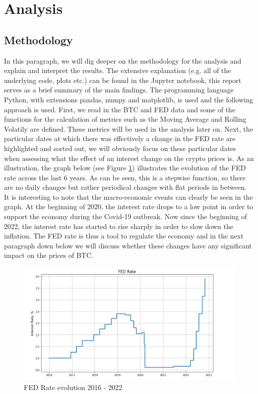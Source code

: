 \documentclass[12pt]{article}
\begin{document}
\section{Analysis}
\subsection{Methodology}
In this paragraph, we will dig deeper on the methodology for the analysis and explain and interpret the results. The extensive explanation (e.g. all of the underlying code, plots etc.) can be found in the Jupyter notebook, this report serves as a brief summary of the main findings. \newline \newline
The programming language Python, with extensions pandas, numpy and matplotlib, is used and the following approach is used. First, we read in the BTC and FED data and some of the functions for the calculation of metrics such as the Moving Average and Rolling Volatily are defined. These metrics will be used in the analysis later on. Next, the particular dates at which there was effectively a change in the FED rate are highlighted and sorted out, we will obviously focus on these particular dates when assessing what the effect of an interest change on the crypto prices is. \newline
\newline As an illustration, the graph below (see Figure \ref{fig:FED Rate evolution 2016 - 2022}) illustrates the evolution of the FED rate across the last 6 years. As can be seen, this is a stepwise function, so there are no daily changes but rather periodical changes with flat periods in between. \newline It is interesting to note that the macro-economic events can clearly be seen in the graph. At the beginning of 2020, the interest rate drops to a low point in order to support the economy during the Covid-19 outbreak. Now since the beginning of 2022, the interest rate has started to rise sharply in order to slow down the inflation. The FED rate is thus a tool to regulate the economy and in the next paragraph down below we will discuss whether these changes have any significant impact on the prices of BTC.

\begin{figure}[!htb]
   \includegraphics[scale=0.6]{research_project/text/paper/FED rate graph.png}
   \centering
   \caption{FED Rate evolution 2016 - 2022}
   \label{fig:FED Rate evolution 2016 - 2022}
\end{figure}
\end{document}
